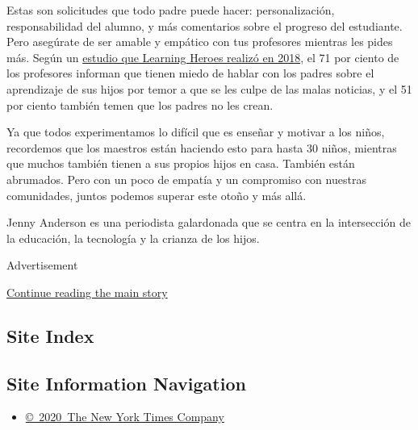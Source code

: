 Estas son solicitudes que todo padre puede hacer: personalización,
responsabilidad del alumno, y más comentarios sobre el progreso del
estudiante. Pero asegúrate de ser amable y empático con tus profesores
mientras les pides más. Según un
\href{https://r50gh2ss1ic2mww8s3uvjvq1-wpengine.netdna-ssl.com/wp-content/uploads/2018/12/2018_Research_Report-final_WEB.pdf}{estudio
que Learning Heroes realizó en 2018}, el 71 por ciento de los profesores
informan que tienen miedo de hablar con los padres sobre el aprendizaje
de sus hijos por temor a que se les culpe de las malas noticias, y el 51
por ciento también temen que los padres no les crean.

Ya que todos experimentamos lo difícil que es enseñar y motivar a los
niños, recordemos que los maestros están haciendo esto para hasta 30
niños, mientras que muchos también tienen a sus propios hijos en casa.
También están abrumados. Pero con un poco de empatía y un compromiso con
nuestras comunidades, juntos podemos superar este otoño y más allá.

Jenny Anderson es una periodista galardonada que se centra en la
intersección de la educación, la tecnología y la crianza de los hijos.

Advertisement

\protect\hyperlink{after-bottom}{Continue reading the main story}

\hypertarget{site-index}{%
\subsection{Site Index}\label{site-index}}

\hypertarget{site-information-navigation}{%
\subsection{Site Information
Navigation}\label{site-information-navigation}}

\begin{itemize}
\tightlist
\item
  \href{https://help.nytimes3xbfgragh.onion/hc/en-us/articles/115014792127-Copyright-notice}{©~2020~The
  New York Times Company}
\end{itemize}

